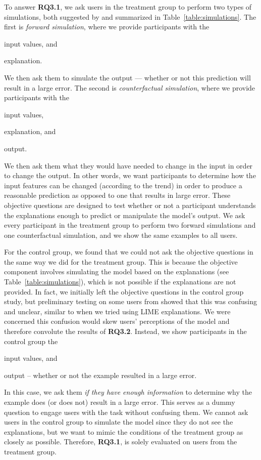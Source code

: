 To answer \textbf{RQ3.1}, we ask users in the treatment group to perform two types of simulations, both suggested by \citet{doshi-2017-towards} and summarized in Table~\ref{table:simulations}. 
The first is \textit{forward simulation}, where we provide participants with the 
\begin{inparaenum}[(i)]
\item input values, and 
\item explanation. 
\end{inparaenum}
We then ask them to simulate the output --- whether or not this prediction will result in a large error. 
The second is \textit{counterfactual simulation}, where we provide participants with the
\begin{inparaenum}[(i)]
\item input values, 
\item explanation, and 
\item output. 
\end{inparaenum}
We then ask them what they would have needed to change in the input in order to change the output. 
In other words, we want participants to determine how the input features can be changed (according to the trend) in order to produce a reasonable prediction as opposed to one that results in large error. 
These objective questions are designed to test whether or not a participant understands the explanations enough to predict or manipulate the model's output. 
We ask every participant in the treatment group to perform two forward simulations and one counterfactual simulation, and we show the same examples to all users. 

For the control group, we found that we could not ask the objective questions in the same way we did for the treatment group. 
This is because the objective component involves simulating the model based on the explanations (see Table~\ref{table:simulations}), which is not possible if the explanations are not provided. 
In fact, we initially left the objective questions in the control group study, but preliminary testing on some users from \OurCompany{} showed that this was confusing and unclear, similar to when we tried using LIME explanations. 
We were concerned this confusion would skew users' perceptions of the model and therefore convolute the results of \textbf{RQ3.2}. 
Instead, we show participants in the control group the
\noindent
\begin{inparaenum}[(i)]
\item input values, and 
\item output -- whether or not the example resulted in a large error. 
\end{inparaenum}
In this case, we ask them \emph{if they have enough information} to determine why the example does (or does not) result in a large error. 
This serves as a dummy question to engage users with the task without confusing them. 
We cannot ask users in the control group to simulate the model since they do not see the explanations, but we want to mimic the conditions of the treatment group as closely as possible. 
Therefore, \textbf{RQ3.1}, is solely evaluated on users from the treatment group. 

